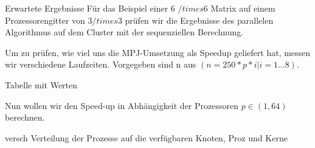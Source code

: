 \documentclass[
ngerman,
subtask=ruled %
]{tudaexercise}
\begin{document}
	

	\begin{task} {Erwartete Ergebnisse}
		Für das Beispiel einer 6 $/times$6 Matrix auf einem Prozessorengitter von 3$/times$3 prüfen wir die Ergebnisse des parallelen Algorithmus auf dem Cluster mit der sequenziellen Berechnung.
		
		Um zu prüfen, wie viel uns die MPJ-Umsetzung als Speedup geliefert hat, messen wir verschiedene Laufzeiten.
		Vorgegeben sind n aus $(n = 250 * p * i | i=1...8)$.
		
		Tabelle mit Werten
		
		Nun wollen wir den Speed-up in Abhängigkeit der Prozessoren $p \in (1, 64)$ berechnen.
		
		versch Verteilung der Prozesse auf die verfügbaren Knoten, Proz und Kerne
	\end{task}


	\appendix
\end{document}

